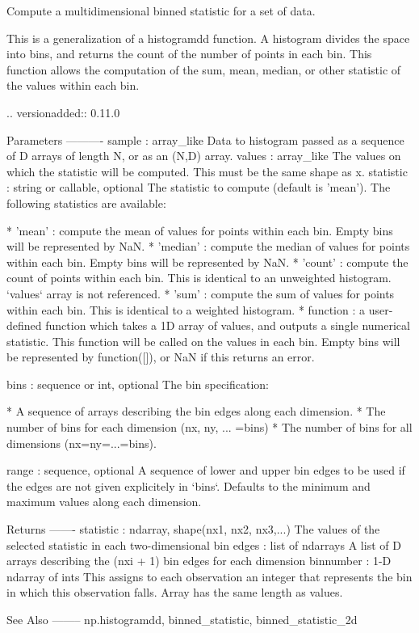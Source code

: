 \begin{DoxyVerb}Compute a multidimensional binned statistic for a set of data.

This is a generalization of a histogramdd function.  A histogram divides
the space into bins, and returns the count of the number of points in
each bin.  This function allows the computation of the sum, mean, median,
or other statistic of the values within each bin.

.. versionadded:: 0.11.0

Parameters
----------
sample : array_like
    Data to histogram passed as a sequence of D arrays of length N, or
    as an (N,D) array.
values : array_like
    The values on which the statistic will be computed.  This must be
    the same shape as x.
statistic : string or callable, optional
    The statistic to compute (default is 'mean').
    The following statistics are available:

      * 'mean' : compute the mean of values for points within each bin.
        Empty bins will be represented by NaN.
      * 'median' : compute the median of values for points within each
        bin. Empty bins will be represented by NaN.
      * 'count' : compute the count of points within each bin.  This is
        identical to an unweighted histogram.  `values` array is not
        referenced.
      * 'sum' : compute the sum of values for points within each bin.
        This is identical to a weighted histogram.
      * function : a user-defined function which takes a 1D array of
        values, and outputs a single numerical statistic. This function
        will be called on the values in each bin.  Empty bins will be
        represented by function([]), or NaN if this returns an error.

bins : sequence or int, optional
    The bin specification:

      * A sequence of arrays describing the bin edges along each dimension.
      * The number of bins for each dimension (nx, ny, ... =bins)
      * The number of bins for all dimensions (nx=ny=...=bins).

range : sequence, optional
    A sequence of lower and upper bin edges to be used if the edges are
    not given explicitely in `bins`. Defaults to the minimum and maximum
    values along each dimension.

Returns
-------
statistic : ndarray, shape(nx1, nx2, nx3,...)
    The values of the selected statistic in each two-dimensional bin
edges : list of ndarrays
    A list of D arrays describing the (nxi + 1) bin edges for each
    dimension
binnumber : 1-D ndarray of ints
    This assigns to each observation an integer that represents the bin
    in which this observation falls. Array has the same length as values.

See Also
--------
np.histogramdd, binned_statistic, binned_statistic_2d\end{DoxyVerb}
 
